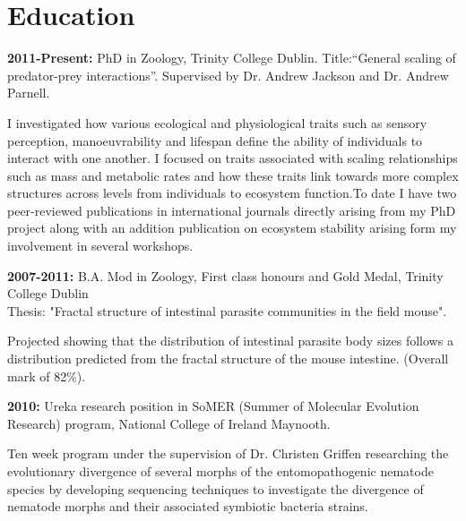 \documentclass[10pt,a4paper]{article}
\begin{document}

\section{Education}

\raggedright	
\textbf{2011-Present:} PhD in Zoology, Trinity College Dublin. Title:“General scaling of predator-prey interactions”. Supervised by Dr. Andrew Jackson and Dr. Andrew Parnell. \smallskip
\par{\fontsize{10.5}{10}\selectfont I investigated how various ecological and physiological traits such as sensory perception, manoeuvrability and lifespan define the ability of individuals to interact with one another. I focused on traits associated with scaling relationships such as mass and metabolic rates and how these traits link towards more complex structures across levels from individuals to ecosystem function.To date I have two peer-reviewed publications in international journals directly arising from my PhD project along with an addition publication on ecosystem stability arising form my involvement in several workshops.\bigskip}


\textbf{2007-2011:} B.A. Mod in Zoology, First class honours and Gold Medal, Trinity College Dublin\\
Thesis: "Fractal structure of intestinal parasite communities in the field mouse".\\
\par{\fontsize{10.5}{10}\selectfont Projected showing that the distribution of intestinal parasite body sizes follows a distribution predicted from the fractal structure of the mouse intestine. (Overall mark of 82\%).\bigskip}

\textbf{2010:} Ureka research position in SoMER (Summer of Molecular Evolution Research) program, National College of Ireland Maynooth.\\
\par{\fontsize{10.5}{10}\selectfont Ten week program under the supervision of Dr. Christen Griffen researching the evolutionary divergence of several morphs of the entomopathogenic nematode species by developing sequencing techniques to investigate the divergence of nematode morphs and their associated symbiotic bacteria strains.\bigskip}
\end{document}
